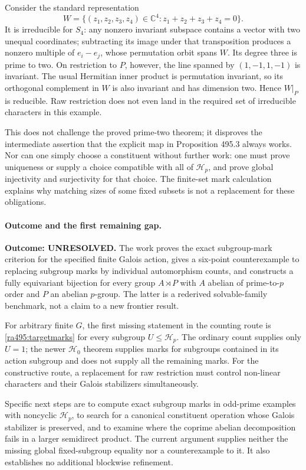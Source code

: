 \documentclass[11pt]{article}
\begin{document}
Consider the standard representation
\[
 W=\{(z_1,z_2,z_3,z_4)\in\mathbb C^4:
                          z_1+z_2+z_3+z_4=0\}.
\]
It is irreducible for $S_4$: any nonzero invariant subspace contains a
vector with two unequal coordinates; subtracting its image under that
transposition produces a nonzero multiple of $e_i-e_j$, whose permutation
orbit spans $W$. Its degree three is prime to two. On restriction to $P$,
however, the line spanned by $(1,-1,1,-1)$ is invariant. The usual
Hermitian inner product is permutation invariant, so its orthogonal
complement in $W$ is also invariant and has dimension two. Hence
$W|_P$ is reducible. Raw restriction does not even land in the required
set of irreducible characters in this example.

This does not challenge the proved prime-two theorem; it disproves the
intermediate assertion that the explicit map in Proposition 495.3 always
works. Nor can one simply choose a constituent without further work:
one must prove uniqueness or supply a choice compatible with all of
$\mathcal H_p$, and prove global injectivity and surjectivity for that
choice. The finite-set mark calculation explains why matching sizes of
some fixed subsets is not a replacement for these obligations.

\paragraph{Outcome and the first remaining gap.}
\textbf{Outcome: UNRESOLVED.} The work proves the exact subgroup-mark
criterion for the specified finite Galois action, gives a six-point
counterexample to replacing subgroup marks by individual automorphism
counts, and constructs a fully equivariant bijection for every group
$A\rtimes P$ with $A$ abelian of prime-to-$p$ order and $P$ an abelian
$p$-group. The latter is a rederived solvable-family benchmark, not a
claim to a new frontier result.

For arbitrary finite $G$, the first missing statement in the counting
route is \eqref{ra495:targetmarks} for every subgroup
$U\leq\mathcal H_p$. The ordinary count supplies only $U=1$; the
newer $\mathcal H_0$ theorem supplies marks for subgroups contained in
its action subgroup and does not supply all the remaining marks.
For the constructive route, a replacement for raw restriction must
control non-linear characters and their Galois stabilizers simultaneously.

Specific next steps are to compute exact subgroup marks in odd-prime
examples with noncyclic $\mathcal H_p$, to search for a canonical
constituent operation whose Galois stabilizer is preserved, and to examine
where the coprime abelian decomposition fails in a larger semidirect
product. The current argument supplies neither the missing global
fixed-subgroup equality nor a counterexample to it. It also establishes
no additional blockwise refinement.
\end{document}
